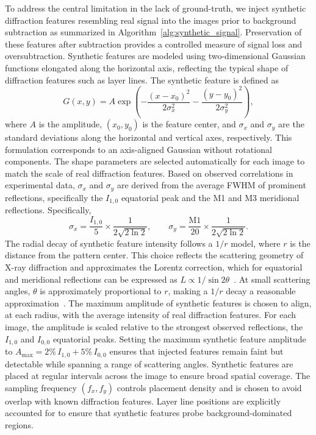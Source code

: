 \documentclass[iucr]{iucrjournals}
\begin{document}
To address the central limitation in the lack of ground-truth, we inject synthetic diffraction features resembling real signal into the images prior to background subtraction as summarized in Algorithm~\ref{alg:synthetic_signal}. Preservation of these features after subtraction provides a controlled measure of signal loss and oversubtraction. Synthetic features are modeled using two-dimensional Gaussian functions elongated along the horizontal axis, reflecting the typical shape of diffraction features such as layer lines. The synthetic feature is defined as
\begin{equation}
G(x, y) = A \exp\!\left(
-\frac{(x-x_0)^2}{2\sigma_x^2}
-\frac{(y-y_0)^2}{2\sigma_y^2}
\right),
\end{equation}
where $A$ is the amplitude, $(x_0, y_0)$ is the feature center, and $\sigma_x$ and $\sigma_y$ are the standard deviations along the horizontal and vertical axes, respectively. This formulation corresponds to an axis-aligned Gaussian without rotational components. The shape parameters are selected automatically for each image to match the scale of real diffraction features. Based on observed correlations in experimental data, $\sigma_x$ and $\sigma_y$ are derived from the average FWHM of prominent reflections, specifically the $I_{1,0}$ equatorial peak and the M1 and M3 meridional reflections. Specifically,
\begin{equation}
\sigma_x = \frac{I_{1,0}}{5} \times \frac{1}{2\sqrt{2\ln2}}, 
\qquad
\sigma_y = \frac{\mathrm{M1}}{20} \times \frac{1}{2\sqrt{2\ln2}}.
\end{equation}
The radial decay of synthetic feature intensity follows a $1/r$ model, where $r$ is the distance from the pattern center. This choice reflects the scattering geometry of X-ray diffraction and approximates the Lorentz correction, which for equatorial and meridional reflections can be expressed as $L \propto 1/\sin 2\theta$~\cite{Buerger1940}. At small scattering angles, $\theta$ is approximately proportional to $r$, making a $1/r$ decay a reasonable approximation~\cite{Denny1995}. The maximum amplitude of synthetic features is chosen to align, at each radius, with the average intensity of real diffraction features. For each image, the amplitude is scaled relative to the strongest observed reflections, the $I_{1,0}$ and $I_{0,0}$ equatorial peaks. Setting the maximum synthetic feature amplitude to $A_{\mathrm{max}} = 2\%\, I_{1,0} + 5\%\, I_{0,0}$ ensures that injected features remain faint but detectable while spanning a range of scattering angles. Synthetic features are placed at regular intervals across the image to ensure broad spatial coverage. The sampling frequency $(f_x, f_y)$ controls placement density and is chosen to avoid overlap with known diffraction features. Layer line positions are explicitly accounted for to ensure that synthetic features probe background-dominated regions.
\end{document}
